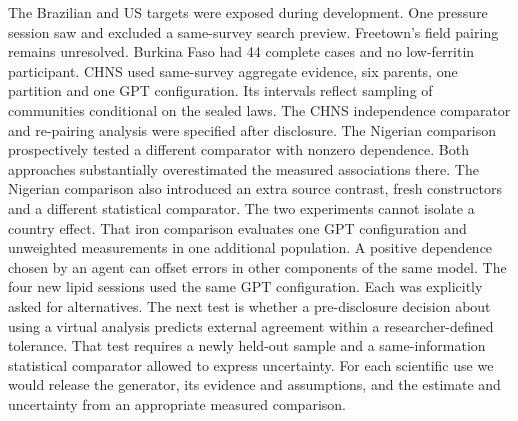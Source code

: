 \documentclass[sigconf,anonymous,review]{acmart}
\begin{document}
The Brazilian and US targets were exposed during development. One pressure session saw and excluded a same-survey search preview. Freetown's field pairing remains unresolved. Burkina Faso had 44 complete cases and no low-ferritin participant. CHNS used same-survey aggregate evidence, six parents, one partition and one GPT configuration. Its intervals reflect sampling of communities conditional on the sealed laws. The CHNS independence comparator and re-pairing analysis were specified after disclosure. The Nigerian comparison prospectively tested a different comparator with nonzero dependence. Both approaches substantially overestimated the measured associations there. The Nigerian comparison also introduced an extra source contrast, fresh constructors and a different statistical comparator. The two experiments cannot isolate a country effect. That iron comparison evaluates one GPT configuration and unweighted measurements in one additional population. A positive dependence chosen by an agent can offset errors in other components of the same model. The four new lipid sessions used the same GPT configuration. Each was explicitly asked for alternatives. The next test is whether a pre-disclosure decision about using a virtual analysis predicts external agreement within a researcher-defined tolerance. That test requires a newly held-out sample and a same-information statistical comparator allowed to express uncertainty. For each scientific use we would release the generator, its evidence and assumptions, and the estimate and uncertainty from an appropriate measured comparison.



\appendix

\end{document}
